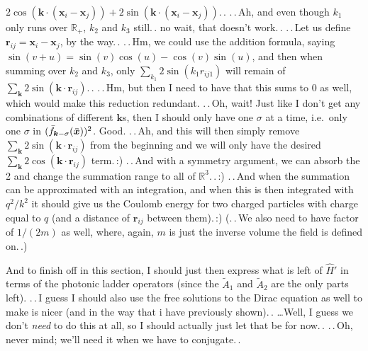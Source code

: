 \documentclass{report}
\begin{document}
$2\cos(\boldsymbol{k}\cdot (\boldsymbol{x}_i - \boldsymbol{x}_j)) + 
2\sin(\boldsymbol{k}\cdot (\boldsymbol{x}_i - \boldsymbol{x}_j))$.\,. .\,.\,Ah, and even though $k_1$ only runs over $\mathbb{R}_+$, $k_2$ and $k_3$ still.\,. no wait, that doesn't work.\,. .\,.\,Let us define $\boldsymbol{r}_{ij} = \boldsymbol{x}_i - \boldsymbol{x}_j$, by the way.\,. .\,.\,Hm, we could use the addition formula, saying $\sin(v + u) = \sin(v)\cos(u) - \cos(v)\sin(u)$, and then when summing over $k_2$ and $k_3$, only $\sum_{k_1} 2\sin(k_1 r_{ij1})$ will remain of $\sum_{\boldsymbol{k}}2\sin(\boldsymbol{k}\cdot \boldsymbol{r}_{ij})$.\,. .\,.\,Hm, but then I need to have that this sums to 0 as well, which would make this reduction redundant. .\,.\,Oh, wait! Just like I don't get any combinations of different $\boldsymbol{k}$s, then I should only have one $\sigma$ at a time, i.e.\ only one $\sigma$ in $(\bar f_{\boldsymbol{k} -\sigma}(\bar{\boldsymbol{x}\hspace{.05em}}\hspace{-.05em}))^2$. Good. .\,.\,Ah, and this will then simply remove $\sum_{\boldsymbol{k}}2\sin(\boldsymbol{k}\cdot \boldsymbol{r}_{ij})$ from the beginning and we will only have the desired $\sum_{\boldsymbol{k}}2\cos(\boldsymbol{k}\cdot \boldsymbol{r}_{ij})$ term.\,:) .\,.\,And with a symmetry argument, we can absorb the 2 and change the summation range to all of $\mathbb{R}^3$.\,.\,:) %
.\,.\,And when the summation can be approximated with an integration, and when this is then integrated with $q^2/k^2$ it should give us the Coulomb energy for two charged particles with charge equal to $q$ (and a distance of $\boldsymbol{r}_{ij}$ between them).\,:) (.\,.\,We also need to have factor of $1/(2m)$ as well, where, again, $m$ is just the inverse volume the field is defined on.\,.)

And to finish off in this section, I should just then express what is left of $\hat H'$ in terms of the photonic ladder operators (since the $\tilde A_1$ and $\tilde A_2$ are the only parts left). .\,.\,I guess I should also use the free solutions to the Dirac equation as well to make is nicer (and in the way that i have previously shown).\,. \ldots Well, I guess we don't \emph{need} to do this at all, so I should actually just let that be for now.\,. .\,.\,Oh, never mind; we'll need it when we have to conjugate.\,. %
\end{document}
